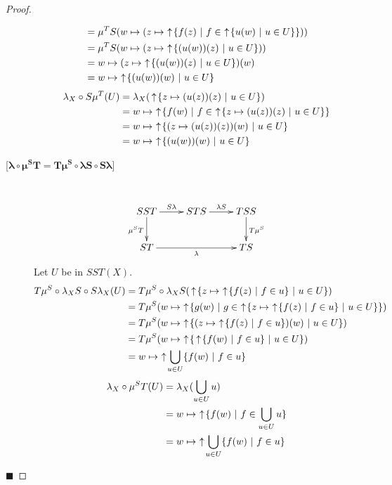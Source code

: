 \begin{proof}
\begin{description}
\begin{align*}
&= \mu^T S(w\mapsto (z\mapsto \,\ua \{f(z)\ |\ f\in \,\ua \{u(w)\ |\ u\in U\}\})) \\
&= \mu^T S(w\mapsto (z\mapsto \,\ua \{(u(w))(z)\ |\ u\in U\})) \\
&= w\mapsto (z\mapsto \,\ua \{(u(w))(z)\ |\ u\in U\})(w) \\
&= w\mapsto \,\ua \{(u(w))(w)\ |\ u\in U\}
\end{align*}
\begin{align*}
\lambda_X\circ S\mu^T(U) 
&= \lambda_X(\ua \{z\mapsto (u(z))(z)\ |\ u\in U\}) \\
&= w\mapsto \,\ua \{f(w)\ |\ f\in \,\ua \{z\mapsto (u(z))(z)\ |\ u\in U\}\} \\
&= w\mapsto \,\ua \{(z\mapsto (u(z))(z))(w)\ |\ u\in U\} \\
&= w\mapsto \,\ua \{(u(w))(w)\ |\ u\in U\}
\end{align*}
\item[{[}$\boldsymbol{\lambda\circ\mu^S T = T\mu^S\circ \lambda S\circ S\lambda}${]}] \hfill \\
\[
\xymatrix{
SST\ar[r]^{S\lambda}\ar[d]_{\mu^S T} & STS\ar[r]^{\lambda S} & TSS\ar[d]^{T\mu^S} \\
ST\ar[rr]_\lambda & & TS
}
\]
Let $U$ be in $SST(X)$.
\begin{align*}
T\mu^S\circ \lambda_X S\circ S\lambda_X(U)
&= T\mu^S\circ \lambda_X S(\ua \{z\mapsto \,\ua \{f(z)\ |\ f\in u\}\ |\ u\in U\}) \\
&= T\mu^S(w\mapsto \,\ua \{g(w)\ |\ g\in \,\ua \{z\mapsto \,\ua \{f(z)\ |\ f\in u\}\ |\ u\in U\}\}) \\
&= T\mu^S(w\mapsto \,\ua \{(z\mapsto \,\ua \{f(z)\ |\ f\in u\})(w)\ |\ u\in U\}) \\
&= T\mu^S(w\mapsto \,\ua \{\ua \{f(w)\ |\ f\in u\}\ |\ u\in U\}) \\
&= w\mapsto \,\ua \bigcup_{u\in U}\{f(w)\ |\ f\in u\}
\end{align*}
\begin{align*}
\lambda_X\circ \mu^S T(U) &= \lambda_X(\bigcup_{u\in U} u) \\
&= w\mapsto \,\,\uparrow\! \{f(w)\ |\ f\in \bigcup_{u\in U} u\} \\
&= w\mapsto \,\,\uparrow\! \bigcup_{u\in U}\{f(w)\ |\ f\in u\}
\end{align*}
\end{description} \hfill $\blacksquare$
\end{proof}

